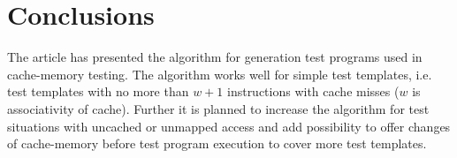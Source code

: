\documentclass[times, 10pt,twocolumn]{article}
\begin{document}
\section{Conclusions}
The article has presented the algorithm for generation test programs used in cache-memory testing. The algorithm works well for simple test templates, i.e. test templates with no more than $w+1$ instructions with cache misses ($w$ is associativity of cache). Further it is planned to increase the algorithm for test situations with uncached or unmapped access and add possibility to offer changes of cache-memory before test program execution to cover more test templates.




\end{document}
